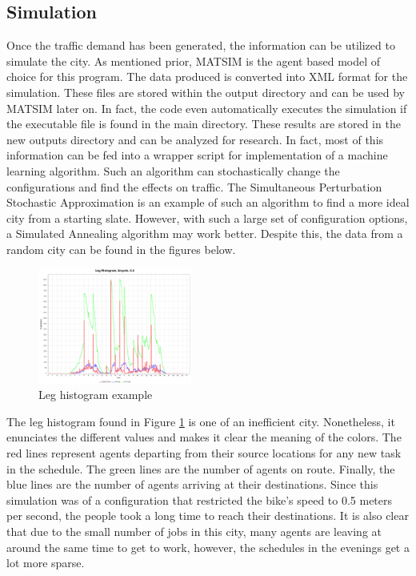 \documentclass[11pt]{article}
\begin{document}
\begin{multicols}{2}
    \section{Simulation}

    \quad Once the traffic demand has been generated, the information can be utilized to simulate the city. As mentioned prior, MATSIM \cite{matsim} is the agent based model of choice for this program. The data produced is converted into XML format for the simulation. These files are stored within the output directory and can be used by MATSIM later on. In fact, the code even automatically executes the simulation if the executable file is found in the main directory. These results are stored in the new outputs directory and can be analyzed for research. In fact, most of this information can be fed into a wrapper script for implementation of a machine learning algorithm. Such an algorithm can stochastically change the configurations and find the effects on traffic. The Simultaneous Perturbation Stochastic Approximation is an example of such an algorithm to find a more ideal city from a starting slate. However, with such a large set of configuration options, a Simulated Annealing algorithm may work better. Despite this, the data from a random city can be found in the figures below.

    \begin{figure}[H]
        \centering
        \includegraphics[width=0.45\textwidth]{images/legHistogram.png}
        \caption{Leg histogram example}
        \label{fig:leg-histogram}
    \end{figure}

    \quad The leg histogram found in Figure \ref{fig:leg-histogram} is one of an inefficient city. Nonetheless, it enunciates the different values and makes it clear the meaning of the colors. The red lines represent agents departing from their source locations for any new task in the schedule. The green lines are the number of agents on route. Finally, the blue lines are the number of agents arriving at their destinations. Since this simulation was of a configuration that restricted the bike's speed to 0.5 meters per second, the people took a long time to reach their destinations. It is also clear that due to the small number of jobs in this city, many agents are leaving at around the same time to get to work, however, the schedules in the evenings get a lot more sparse. \\


\end{multicols}
\end{document}
